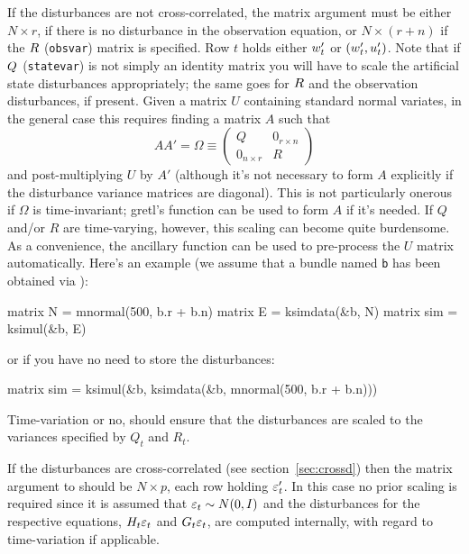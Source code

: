If the disturbances are not cross-correlated, the matrix argument must
be either $N \times r$, if there is no disturbance in the observation
equation, or $N \times (r+n)$ if the $R$ (\texttt{obsvar})
matrix is specified. Row $t$ holds either $w_t'$ or
$(w_t', u_t')$. Note that if $Q$
(\texttt{statevar}) is not simply an identity matrix you will have to
scale the artificial state disturbances appropriately; the same goes
for $R$ and the observation disturbances, if present. Given a
matrix $U$ containing standard normal variates, in the general case
this requires finding a matrix $A$ such that
\[
AA' = \Omega \equiv \left(
\begin{array}{ll}
Q & 0_{r \times n} \\
0_{n\times r} & R
\end{array}
\right)
\]
and post-multiplying $U$ by $A'$ (although it's not necessary to form
$A$ explicitly if the disturbance variance matrices are
diagonal). This is not particularly onerous if $\Omega$ is
time-invariant; gretl's  function can be used to form $A$
if it's needed. If $Q$ and/or $R$ are time-varying, however, this
scaling can become quite burdensome. As a convenience, the ancillary
function  can be used to pre-process the $U$ matrix
automatically. Here's an example (we assume that a bundle named
\texttt{b} has been obtained via ):
%
\begin{code}
matrix N = mnormal(500, b.r + b.n)
matrix E = ksimdata(&b, N)
matrix sim = ksimul(&b, E)
\end{code}
%
or if you have no need to store the disturbances:
%
\begin{code}
matrix sim = ksimul(&b, ksimdata(&b, mnormal(500, b.r + b.n)))
\end{code}
%
Time-variation or no,  should ensure that the
disturbances are scaled to the variances specified by $Q_t$ and $R_t$.

If the disturbances are cross-correlated (see
section~\ref{sec:crossd}) then the matrix argument to 
should be $N \times p$, each row holding $\varepsilon_t'$. In this case
no prior scaling is required since it is assumed that
$\varepsilon_t \sim N(0, I)$ and the disturbances for the respective
equations, $H_t \varepsilon_t$ and $G_t \varepsilon_t$,
are computed internally, with regard to time-variation if applicable.

